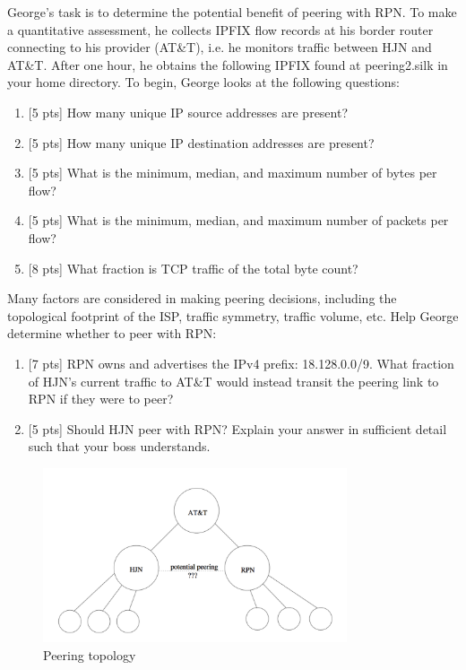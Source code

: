 George’s task is to determine the potential benefit of peering with RPN. To make a quantitative assessment, he collects IPFIX flow records at his border router connecting to his provider (AT\&T), i.e. he monitors traffic between HJN and AT\&T. After one hour, he obtains the following IPFIX found at peering2.silk in your home directory.
To begin, George looks at the following questions:
\begin{enumerate}[resume]
\item {[5 pts]} How many unique IP source addresses are present?
\item {[5 pts]} How many unique IP destination addresses are present?
\item {[5 pts]} What is the minimum, median, and maximum number of bytes per flow? 
\item {[5 pts]} What is the minimum, median, and maximum number of packets per flow? 
\item {[8 pts]} What fraction is TCP traffic of the total byte count?
\end{enumerate}
                 
Many factors are considered in making peering decisions, including the topological footprint of the ISP, traffic symmetry, traffic volume, etc. Help George determine whether to peer with RPN:
\begin{enumerate}[resume]
\item {[7 pts]} RPN owns and advertises the IPv4 prefix: 18.128.0.0/9. What fraction of HJN’s current traffic to AT\&T would instead transit the peering link to RPN if they were to peer?
\item {[5 pts]} Should HJN peer with RPN? Explain your answer in sufficient detail such that your boss understands.
\end{enumerate}

\begin{figure}[H]
\begin{center}
\includegraphics [width=0.8\textwidth]{pic.png}
\end{center}
\caption{Peering topology}
\label{fig:topology}
\end{figure}
